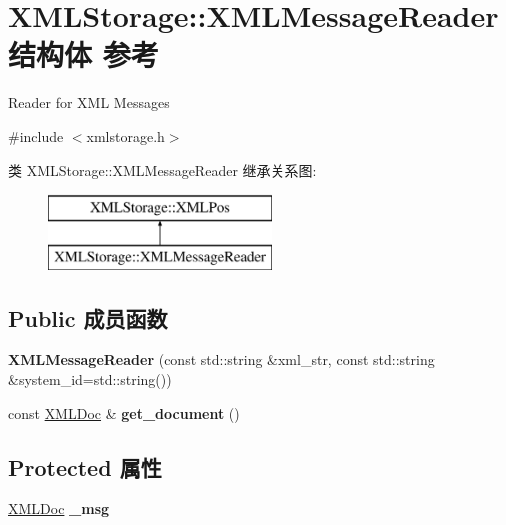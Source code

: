 \hypertarget{struct_x_m_l_storage_1_1_x_m_l_message_reader}{}\section{X\+M\+L\+Storage\+:\+:X\+M\+L\+Message\+Reader结构体 参考}
\label{struct_x_m_l_storage_1_1_x_m_l_message_reader}


Reader for X\+ML Messages  




{\ttfamily \#include $<$xmlstorage.\+h$>$}

类 X\+M\+L\+Storage\+:\+:X\+M\+L\+Message\+Reader 继承关系图\+:\begin{figure}[H]
\begin{center}
\leavevmode
\includegraphics[height=2.000000cm]{struct_x_m_l_storage_1_1_x_m_l_message_reader}
\end{center}
\end{figure}
\subsection*{Public 成员函数}
\begin{DoxyCompactItemize}
\item 
\mbox{\label{struct_x_m_l_storage_1_1_x_m_l_message_reader_a34367bd47696260df96b601598c67963}} 
{\bfseries X\+M\+L\+Message\+Reader} (const std\+::string \&xml\+\_\+str, const std\+::string \&system\+\_\+id=std\+::string())
\item 
\mbox{\label{struct_x_m_l_storage_1_1_x_m_l_message_reader_a3c86dfe235a236d5131bcef4a9f0b44b}} 
const \hyperlink{struct_x_m_l_storage_1_1_x_m_l_doc}{X\+M\+L\+Doc} \& {\bfseries get\+\_\+document} ()
\end{DoxyCompactItemize}
\subsection*{Protected 属性}
\begin{DoxyCompactItemize}
\item 
\mbox{\label{struct_x_m_l_storage_1_1_x_m_l_message_reader_a58d891043986b5a037e771d88d99c1aa}} 
\hyperlink{struct_x_m_l_storage_1_1_x_m_l_doc}{X\+M\+L\+Doc} {\bfseries \+\_\+msg}
\end{DoxyCompactItemize}
